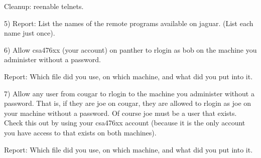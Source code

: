 Cleanup: reenable telnets.

5) Report: List the names of the remote programs available on {\ltt{}jaguar}.
(List each name just once).

6) Allow csa476xx (your account) on {\ltt{}panther} to rlogin as bob 
on the machine you administer without a password.

Report: Which file did you use, on which machine, and what did you put into it.

7) Allow any user from {\ltt{}cougar} to rlogin to the machine you administer 
without a password.
That is, if they are joe on {\ltt{}cougar}, they are allowed to rlogin as
joe on your
machine without a password. Of course joe must be  a user that exists.
Check this out by using your csa476xx account (because it is the only
account you have access to that exists on both machines).

Report: Which file did you use, on which machine, and what did you put into it.
\bye
